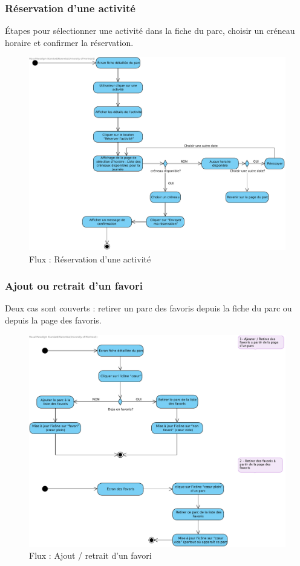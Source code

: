 \documentclass[12pt,a4paper]{article}
\begin{document}
\subsubsection{Réservation d'une activité}

Étapes pour sélectionner une activité dans la fiche du parc, choisir un créneau horaire et confirmer la réservation.

\begin{figure}[h!]
  \centering
  \includegraphics[width=0.9\linewidth]{attachments/Reservation_Activite.pdf}
  \caption{Flux : Réservation d'une activité}
\end{figure}

\subsubsection{Ajout ou retrait d'un favori}

Deux cas sont couverts : retirer un parc des favoris depuis la fiche du parc ou depuis la page des favoris.

\begin{figure}[h!]
  \centering
  \includegraphics[width=0.9\linewidth]{attachments/Ajout_retrait_d_un_favori.pdf}
  \caption{Flux : Ajout / retrait d'un favori}
\end{figure}
\end{document}
